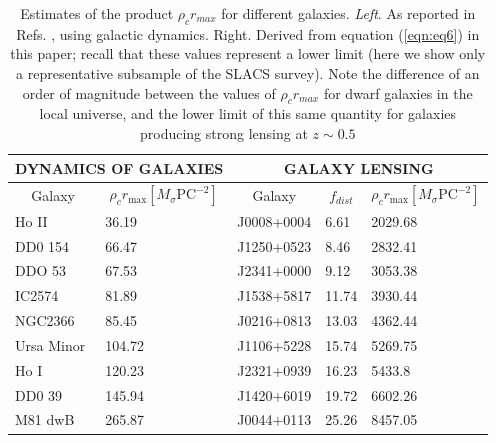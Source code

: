 \documentclass[9.5pt, twocolumn]{article}
\begin{document}
\begin{table}
\centering
\begin{tabular}{|l|l|l|l|l|} 
\hline
\multicolumn{2}{|c|}{DYNAMICS OF GALAXIES}                  & \multicolumn{3}{c|}{GALAXY LENSING}                                                        \\ 
\hline
\multicolumn{1}{|c|}{Galaxy} & \multicolumn{1}{c|}{$\rho_{c} r_{\mathrm{max}} \left[ M_{\sigma} \mathrm{PC}^{-2}\right]$} & \multicolumn{1}{c|}{Galaxy} & \multicolumn{1}{c|}{$f_{dist}$} & \multicolumn{1}{c|}{$\rho_{c} r_{\mathrm{max}} \left[ M_{\sigma} \mathrm{PC}^{-2}\right]$}  \\ 
\hline
Ho II                        & 36.19                        & J0008+0004                  & 6.61                         & 2029.68                       \\ 
\hline
DD0 154                      & 66.47                        & J1250+0523                  & 8.46                         & 2832.41                       \\ 
\hline
DDO 53                       & 67.53                        & J2341+0000                  & 9.12                         & 3053.38                       \\ 
\hline
IC2574                       & 81.89                        & J1538+5817                  & 11.74                        & 3930.44                       \\ 
\hline
NGC2366                      & 85.45                        & J0216+0813                  & 13.03                        & 4362.44                       \\ 
\hline
Ursa Minor                   & 104.72                       & J1106+5228                  & 15.74                        & 5269.75                       \\ 
\hline
Ho I                         & 120.23                       & J2321+0939                  & 16.23                        & 5433.8                        \\ 
\hline
DD0 39                       & 145.94                       & J1420+6019                  & 19.72                        & 6602.26                       \\ 
\hline
M81 dwB                      & 265.87                       & J0044+0113                  & 25.26                        & 8457.05                       \\
\hline
\end{tabular}
\caption{Estimates of the product $\rho_{c}r_{max}$ for different galaxies. \textit{Left}. As reported in Refs. \cite{Arbey_2003}, using galactic dynamics.
Right. Derived from equation (\ref{eqn:eq6}) in this paper; recall that these values represent a lower limit (here we show only a representative
subsample of the SLACS survey). Note the difference of an order of magnitude between the values of $\rho_{c}r_{max}$ for dwarf galaxies
in the local universe, and the lower limit of this same quantity for galaxies producing strong lensing at $z\sim 0.5$}
\label{table:Tabla1}
\end{table}
\end{document}
